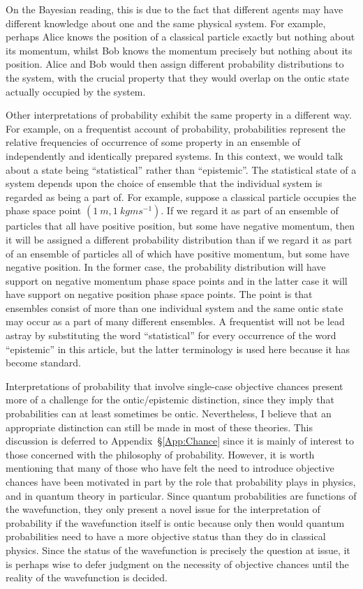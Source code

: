 \documentclass[DIV=calc,fontsize=12pt]{scrartcl} %
\theoremstyle{definition}
\theoremstyle{plain}
\begin{document}
On the Bayesian reading, this is due to the fact
that different agents may have different knowledge about one and the
same physical system.  For example, perhaps Alice knows the position
of a classical particle exactly but nothing about its momentum, whilst
Bob knows the momentum precisely but nothing about its position.
Alice and Bob would then assign different probability distributions to
the system, with the crucial property that they would overlap on the
ontic state actually occupied by the system.

Other interpretations of probability exhibit the same property in a
different way.  For example, on a frequentist account of probability,
probabilities represent the relative frequencies of occurrence of some
property in an ensemble of independently and identically prepared
systems.  In this context, we would talk about a state being
``statistical'' rather than ``epistemic''.  The statistical state of a
system depends upon the choice of ensemble that the individual system
is regarded as being a part of.  For example, suppose a classical
particle occupies the phase space point $(1~m,1~kgms^{-1})$.  If we
regard it as part of an ensemble of particles that all have positive
position, but some have negative momentum, then it will be assigned a
different probability distribution than if we regard it as part of an
ensemble of particles all of which have positive momentum, but some
have negative position.  In the former case, the probability
distribution will have support on negative momentum phase space points
and in the latter case it will have support on negative position phase
space points.  The point is that ensembles consist of more than one
individual system and the same ontic state may occur as a part of many
different ensembles.  A frequentist will not be lead astray by
substituting the word ``statistical'' for every occurrence of the word
``epistemic'' in this article, but the latter terminology is used here
because it has become standard.

Interpretations of probability that involve single-case objective
chances present more of a challenge for the ontic/epistemic
distinction, since they imply that probabilities can at least
sometimes be ontic.  Nevertheless, I believe that an appropriate
distinction can still be made in most of these theories.  This
discussion is deferred to Appendix~\S\ref{App:Chance} since it is
mainly of interest to those concerned with the philosophy of
probability.  However, it is worth mentioning that many of those who
have felt the need to introduce objective chances have been motivated
in part by the role that probability plays in physics, and in quantum
theory in particular.  Since quantum probabilities are functions of
the wavefunction, they only present a novel issue for the
interpretation of probability if the wavefunction itself is ontic
because only then would quantum probabilities need to have a more
objective status than they do in classical physics.  Since the status
of the wavefunction is precisely the question at issue, it is perhaps
wise to defer judgment on the necessity of objective chances until the
reality of the wavefunction is decided.
\end{document}
